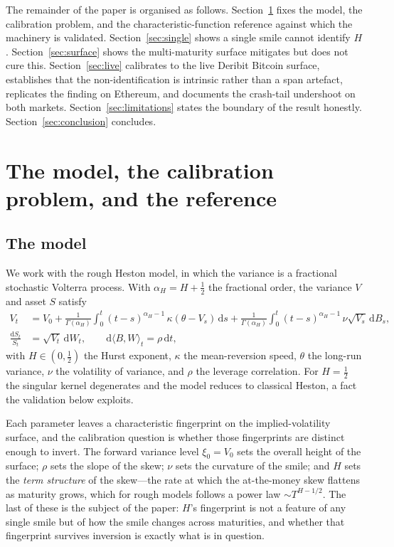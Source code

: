 \documentclass[11pt]{article}
\begin{document}
The remainder of the paper is organised as follows.
Section~\ref{sec:setup} fixes the model, the calibration problem, and the
characteristic-function reference against which the machinery is validated.
Section~\ref{sec:single} shows a single smile cannot identify $H$.
Section~\ref{sec:surface} shows the multi-maturity surface mitigates but does not cure this.
Section~\ref{sec:live} calibrates to the live Deribit Bitcoin surface, establishes that the
non-identification is intrinsic rather than a span artefact, replicates the finding on
Ethereum, and documents the crash-tail undershoot on both markets.
Section~\ref{sec:limitations} states the boundary of the result honestly.
Section~\ref{sec:conclusion} concludes.

\section{The model, the calibration problem, and the reference}\label{sec:setup}

\subsection{The model}

We work with the rough Heston model, in which the variance is a fractional stochastic
Volterra process. With $\alpha_{\!H}=H+\tfrac12$ the fractional order, the variance $V$ and
asset $S$ satisfy
\begin{align}
V_t &= V_0 + \frac{1}{\Gamma(\alpha_{\!H})}\int_0^t (t-s)^{\alpha_{\!H}-1}\,
       \kappa(\theta - V_s)\,\mathrm{d}s
     + \frac{1}{\Gamma(\alpha_{\!H})}\int_0^t (t-s)^{\alpha_{\!H}-1}\,
       \nu\sqrt{V_s}\,\mathrm{d}B_s, \\
\frac{\mathrm{d}S_t}{S_t} &= \sqrt{V_t}\,\mathrm{d}W_t,
\qquad \mathrm{d}\langle B,W\rangle_t = \rho\,\mathrm{d}t,
\end{align}
with $H\in(0,\tfrac12)$ the Hurst exponent, $\kappa$ the mean-reversion speed, $\theta$ the
long-run variance, $\nu$ the volatility of variance, and $\rho$ the leverage correlation.
For $H=\tfrac12$ the singular kernel degenerates and the model reduces to classical Heston, a
fact the validation below exploits.

Each parameter leaves a characteristic fingerprint on the implied-volatility surface, and the
calibration question is whether those fingerprints are distinct enough to invert. The forward
variance level $\xi_0=V_0$ sets the overall height of the surface; $\rho$ sets the slope of the
skew; $\nu$ sets the curvature of the smile; and $H$ sets the \emph{term structure} of the
skew---the rate at which the at-the-money skew flattens as maturity grows, which for rough
models follows a power law $\sim T^{H-1/2}$. The last of these is the subject of the paper:
$H$'s fingerprint is not a feature of any single smile but of how the smile changes across
maturities, and whether that fingerprint survives inversion is exactly what is in question.
\end{document}
